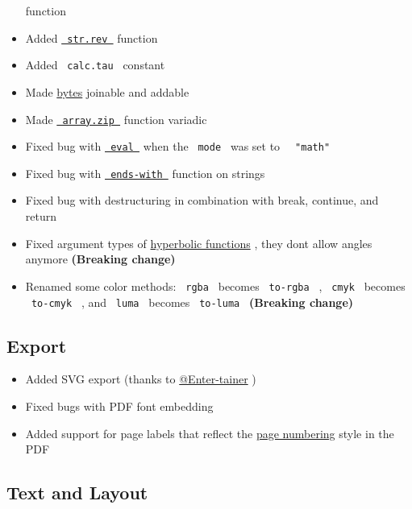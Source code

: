 \begin{itemize}
  function
\item
  Added
  \href{/docs/reference/foundations/str/\#definitions-rev}{\texttt{\ str.rev\ }}
  function
\item
  Added \texttt{\ calc.tau\ } constant
\item
  Made \href{/docs/reference/foundations/bytes/}{bytes} joinable and
  addable
\item
  Made
  \href{/docs/reference/foundations/array/\#definitions-zip}{\texttt{\ array.zip\ }}
  function variadic
\item
  Fixed bug with
  \href{/docs/reference/foundations/eval/}{\texttt{\ eval\ }} when the
  \texttt{\ mode\ } was set to
  \texttt{\ }{\texttt{\ "math"\ }}\texttt{\ }
\item
  Fixed bug with
  \href{/docs/reference/foundations/str/\#definitions-ends-with}{\texttt{\ ends-with\ }}
  function on strings
\item
  Fixed bug with destructuring in combination with break, continue, and
  return
\item
  Fixed argument types of
  \href{/docs/reference/foundations/calc/\#functions-cosh}{hyperbolic
  functions} , they don\textquotesingle t allow angles anymore
  \textbf{(Breaking change)}
\item
  Renamed some color methods: \texttt{\ rgba\ } becomes
  \texttt{\ to-rgba\ } , \texttt{\ cmyk\ } becomes \texttt{\ to-cmyk\ }
  , and \texttt{\ luma\ } becomes \texttt{\ to-luma\ } \textbf{(Breaking
  change)}
\end{itemize}

\subsection{Export}\label{export}

\begin{itemize}
\tightlist
\item
  Added SVG export (thanks to
  \href{https://github.com/Enter-tainer}{@Enter-tainer} )
\item
  Fixed bugs with PDF font embedding
\item
  Added support for page labels that reflect the
  \href{/docs/reference/layout/page/\#parameters-numbering}{page
  numbering} style in the PDF
\end{itemize}

\subsection{Text and Layout}\label{text-and-layout}

